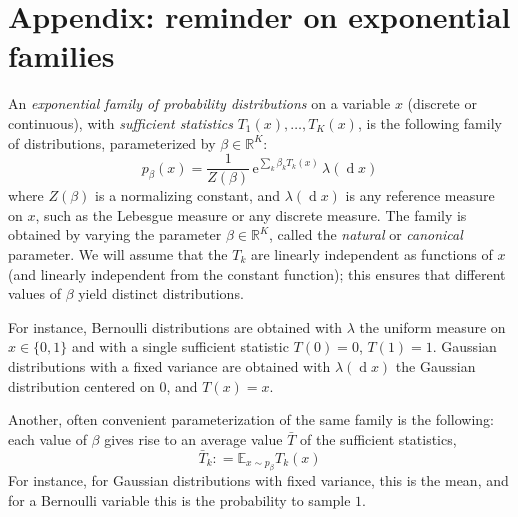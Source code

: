 \documentclass[11pt,a4paper]{article}
\def\d{\operatorname{d}\!{}}
\def\R{{\mathbb{R}}}
\newcommand{\deq}{\mathrel{\mathop{:}}=}
\newcommand{\E}{\mathbb{E}}
\newcommand{\1}{\mathbbm{1}}
\theoremstyle{yannthm}
\theoremstyle{yannthm2}
\newcommand{\transp}[1]{#1^{\!\top}\!}
\numberwithin{equation}{section}
\begin{document}



{\small

\appendix

\section{Appendix: reminder on exponential families}

\newcommand{\tsum}{{\textstyle \sum}}

An \emph{exponential family of probability distributions} on a variable
$x$ (discrete or continuous), with \emph{sufficient statistics}
$T_1(x),\ldots,T_K(x)$, is the
following family of distributions, parameterized by $\beta\in \R^K$:
\begin{equation}
p_\beta(x)=\frac{1}{Z(\beta)}\,\mathrm{e}^{\sum_k \beta_k T_k(x)}\,\lambda(\d x)
\end{equation}
where $Z(\beta)$ is a normalizing constant, and $\lambda(\d x)$ is any reference
measure on $x$, such as the Lebesgue measure or any discrete measure. The
family is obtained by varying the parameter $\beta\in \R^K$, called the
\emph{natural} or \emph{canonical} parameter. We will assume that the
$T_k$ are linearly independent as functions of $x$ (and linearly
independent from the constant function); this ensures that
different values of $\beta$ yield distinct distributions.

For instance, Bernoulli distributions are obtained with $\lambda$
the uniform measure on $x\in \{0,1\}$ and with a single sufficient
statistic $T(0)=0$, $T(1)=1$. Gaussian
distributions with a fixed variance are obtained with $\lambda(\d
x)$ the Gaussian distribution centered on $0$, and $T(x)=x$.

Another, often convenient parameterization of the same family is the
following: each value of $\beta$ gives rise to an average value $\bar T$
of the sufficient statistics, \begin{equation} \bar T_k\deq \E_{x\sim
p_\beta} T_k(x) \end{equation} For instance, for Gaussian distributions
with fixed variance, this is the mean, and for a Bernoulli variable this
is the probability to sample $1$.

}
\end{document}
